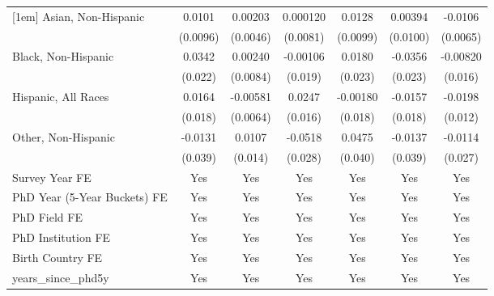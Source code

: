 \begin{table}[htbp]
\begin{tabular}{l*{6}{c}}
[1em]
Asian, Non-Hispanic&      0.0101         &     0.00203         &    0.000120         &      0.0128         &     0.00394         &     -0.0106         \\
  &    (0.0096)         &    (0.0046)         &    (0.0081)         &    (0.0099)         &    (0.0100)         &    (0.0065)         \\
[1em]
Black, Non-Hispanic&      0.0342         &     0.00240         &    -0.00106         &      0.0180         &     -0.0356         &    -0.00820         \\
  &     (0.022)         &    (0.0084)         &     (0.019)         &     (0.023)         &     (0.023)         &     (0.016)         \\
[1em]
Hispanic, All Races&      0.0164         &    -0.00581         &      0.0247         &    -0.00180         &     -0.0157         &     -0.0198\sym{*}  \\
  &     (0.018)         &    (0.0064)         &     (0.016)         &     (0.018)         &     (0.018)         &     (0.012)         \\
[1em]
Other, Non-Hispanic&     -0.0131         &      0.0107         &     -0.0518\sym{*}  &      0.0475         &     -0.0137         &     -0.0114         \\
  &     (0.039)         &     (0.014)         &     (0.028)         &     (0.040)         &     (0.039)         &     (0.027)         \\
[1em]
Survey Year FE&         Yes         &         Yes         &         Yes         &         Yes         &         Yes         &         Yes         \\
[1em]
PhD Year (5-Year Buckets) FE&         Yes         &         Yes         &         Yes         &         Yes         &         Yes         &         Yes         \\
[1em]
PhD Field FE&         Yes         &         Yes         &         Yes         &         Yes         &         Yes         &         Yes         \\
[1em]
PhD Institution FE&         Yes         &         Yes         &         Yes         &         Yes         &         Yes         &         Yes         \\
[1em]
Birth Country FE&         Yes         &         Yes         &         Yes         &         Yes         &         Yes         &         Yes         \\
[1em]
years\_since\_phd5y&         Yes         &         Yes         &         Yes         &         Yes         &         Yes         &         Yes         \\

\end{tabular}
\end{table}

